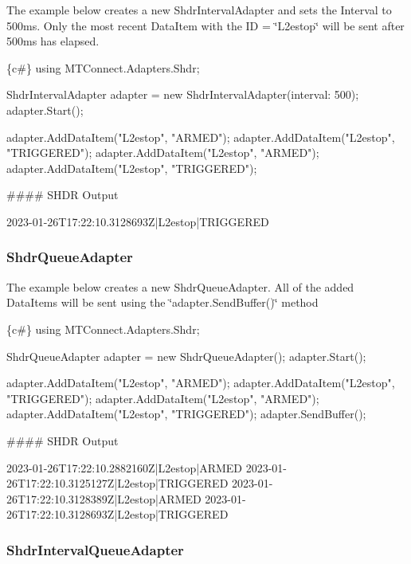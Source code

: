 The example below creates a new Shdr\+Interval\+Adapter and sets the Interval to 500ms. Only the most recent Data\+Item with the ID = \char`\"{}\+L2estop\char`\"{} will be sent after 500ms has elapsed. 
\begin{DoxyCode}
\{c#\}
using MTConnect.Adapters.Shdr;

ShdrIntervalAdapter adapter = new ShdrIntervalAdapter(interval: 500);
adapter.Start();

adapter.AddDataItem("L2estop", "ARMED");
adapter.AddDataItem("L2estop", "TRIGGERED");
adapter.AddDataItem("L2estop", "ARMED");
adapter.AddDataItem("L2estop", "TRIGGERED");
\end{DoxyCode}
 \#\#\#\# S\+H\+DR Output 
\begin{DoxyCode}
2023-01-26T17:22:10.3128693Z|L2estop|TRIGGERED
\end{DoxyCode}


\subsubsection*{Shdr\+Queue\+Adapter}

The example below creates a new Shdr\+Queue\+Adapter. All of the added Data\+Items will be sent using the \char`\"{}adapter.\+Send\+Buffer()\char`\"{} method 
\begin{DoxyCode}
\{c#\}
using MTConnect.Adapters.Shdr;

ShdrQueueAdapter adapter = new ShdrQueueAdapter();
adapter.Start();

adapter.AddDataItem("L2estop", "ARMED");
adapter.AddDataItem("L2estop", "TRIGGERED");
adapter.AddDataItem("L2estop", "ARMED");
adapter.AddDataItem("L2estop", "TRIGGERED");
adapter.SendBuffer();
\end{DoxyCode}
 \#\#\#\# S\+H\+DR Output 
\begin{DoxyCode}
2023-01-26T17:22:10.2882160Z|L2estop|ARMED
2023-01-26T17:22:10.3125127Z|L2estop|TRIGGERED
2023-01-26T17:22:10.3128389Z|L2estop|ARMED
2023-01-26T17:22:10.3128693Z|L2estop|TRIGGERED
\end{DoxyCode}


\subsubsection*{Shdr\+Interval\+Queue\+Adapter}

